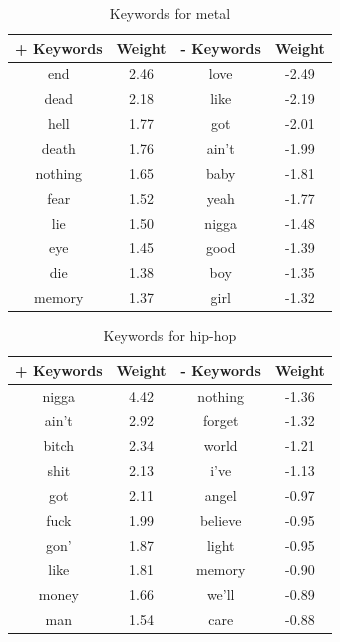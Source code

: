 \documentclass[a4paper,11pt]{article}
\begin{document}
\begin{table}[h!]
\centering
\label{baseline}
\begin{tabular}{cccc}
\hline
+ Keywords & Weight & - Keywords & Weight \\
\hline
end & 2.46 & love & -2.49 \\
dead & 2.18 & like & -2.19 \\
hell & 1.77 & got & -2.01 \\
death & 1.76 & ain't & -1.99 \\
nothing & 1.65 & baby & -1.81 \\
fear & 1.52 & yeah & -1.77 \\
lie & 1.50 & nigga & -1.48 \\
eye & 1.45 & good & -1.39 \\
die & 1.38 & boy & -1.35 \\
memory & 1.37 & girl & -1.32 \\
\end{tabular}
\caption{Keywords for metal}
\end{table}

\begin{table}[h!]
\centering
\label{baseline}
\begin{tabular}{cccc}
\hline
+ Keywords & Weight & - Keywords & Weight \\
\hline
nigga & 4.42 & nothing & -1.36 \\
ain't & 2.92 & forget & -1.32 \\
bitch & 2.34 & world & -1.21 \\
shit & 2.13 & i've & -1.13 \\
got & 2.11 & angel & -0.97 \\
fuck & 1.99 & believe & -0.95 \\
gon' & 1.87 & light & -0.95 \\
like & 1.81 & memory & -0.90 \\
money & 1.66 & we'll & -0.89 \\
man & 1.54 & care & -0.88 \\
\end{tabular}
\caption{Keywords for hip-hop}
\end{table}


\end{document}
